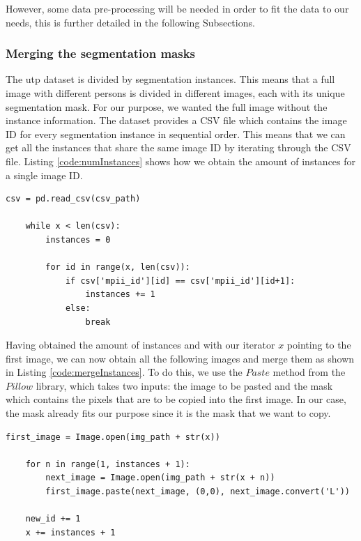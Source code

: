However, some data pre-processing will be needed in order to fit the data to our needs, this is further detailed in the following Subsections.

\subsubsection{Merging the segmentation masks}
The \gls{utp} dataset is divided by segmentation instances. This means that a full image with different persons is divided in different images, each with its unique segmentation mask. For our purpose, we wanted the full image without the instance information. The dataset provides a CSV file which contains the image ID for every segmentation instance in sequential order. This means that we can get all the instances that share the same image ID by iterating through the CSV file. Listing \ref{code:numInstances} shows how we obtain the amount of instances for a single image ID.

\begin{lstlisting}[style=Python-color, caption=Obtaining the number of instances for a single image, frame=single, label=code:numInstances]
	csv = pd.read_csv(csv_path)
	
	while x < len(csv):
		instances = 0
		
		for id in range(x, len(csv)):
			if csv['mpii_id'][id] == csv['mpii_id'][id+1]:
				instances += 1
			else:
				break
\end{lstlisting}

Having obtained the amount of instances and with our iterator $x$ pointing to the first image, we can now obtain all the following images and merge them as shown in Listing \ref{code:mergeInstances}. To do this, we use the $Paste$ method from the $Pillow$ library, which takes two inputs: the image to be pasted and the mask which contains the pixels that are to be copied into the first image. In our case, the mask already fits our purpose since it is the mask that we want to copy.

\begin{lstlisting}[style=Python-color, caption=Merging the instance masks into a single image, frame=single, label=code:mergeInstances]
	first_image = Image.open(img_path + str(x))
	
	for n in range(1, instances + 1):
		next_image = Image.open(img_path + str(x + n))
		first_image.paste(next_image, (0,0), next_image.convert('L'))
		
	new_id += 1
	x += instances + 1
\end{lstlisting}

